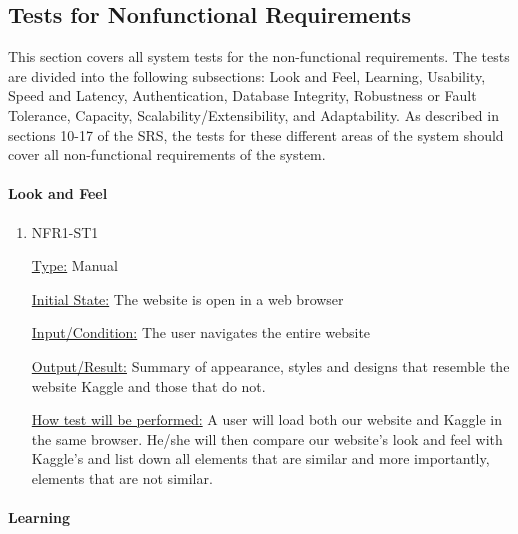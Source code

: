 \documentclass[12pt, titlepage]{article}
\begin{document}
\subsection{Tests for Nonfunctional Requirements}

This section covers all system tests for the non-functional requirements. The tests are divided into the following subsections: Look and Feel, Learning, Usability, Speed and Latency, Authentication, Database Integrity, Robustness or Fault Tolerance, Capacity, Scalability/Extensibility, and Adaptability. As described in sections 10-17 of the SRS, the tests for these different areas of the system should cover all non-functional requirements of the system.
  
\paragraph{Look and Feel}

\begin{enumerate}

\item{NFR1-ST1\\}

\underline{Type:} Manual

\underline{Initial State:} The website is open in a web browser

\underline{Input/Condition:} The user navigates the entire website

\underline{Output/Result:} Summary of appearance, styles and designs that resemble the website Kaggle and those that do not.

\underline{How test will be performed:} 
A user will load both our website and Kaggle in the same browser. He/she will then compare our website’s look and feel with Kaggle’s and list down all elements that are similar and more importantly, elements that are not similar.

\end{enumerate}

\paragraph{Learning}
\end{document}
